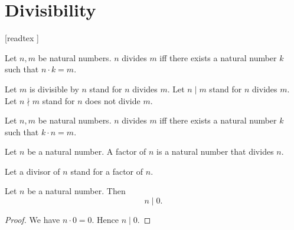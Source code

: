 \documentclass[../arithmetic.tex]{subfiles}
\begin{document}
  \chapter{Divisibility}\label{chapter:divisibility}


  \begin{forthel}

    [readtex ]

  \end{forthel}


  \begin{forthel}
    \begin{definition}
      Let $n, m$ be natural numbers.
      $n$ divides $m$ iff there exists a natural number $k$ such that
      $n \cdot k = m$.
    \end{definition}

    Let $m$ is divisible by $n$ stand for $n$ divides $m$.
    Let $n \mid m$ stand for $n$ divides $m$.
    Let $n \nmid m$ stand for $n$ does not divide $m$.
  \end{forthel}

  \begin{forthel}
    \begin{lemma}
      Let $n, m$ be natural numbers.
      $n$ divides $m$ iff there exists a natural number $k$ such that
      $k \cdot n = m$.
    \end{lemma}
  \end{forthel}

  \begin{forthel}
    \begin{definition}
      Let $n$ be a natural number.
      A factor of $n$ is a natural number that divides $n$.
    \end{definition}

    Let a divisor of $n$ stand for a factor of $n$.
  \end{forthel}

  \begin{forthel}
    \begin{proposition}
      Let $n$ be a natural number.
      Then \[ n \mid 0. \]
    \end{proposition}
    \begin{proof}
      We have $n \cdot 0 = 0$.
      Hence $n \mid 0$.
    \end{proof}
  \end{forthel}
\end{document}
